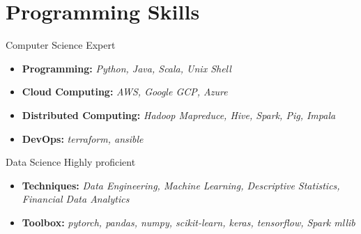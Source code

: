 \section{Programming Skills}\label{sec:programming-skills}

\resumeSubHeadingListStart
\resumeSubheading
{Computer Science}{}
{Expert}{}
\begin{itemize}
    \item \textbf{Programming:} \emph{Python, Java, Scala, Unix Shell}
    \item \textbf{Cloud Computing:} \emph{AWS, Google GCP, Azure}
    \item \textbf{Distributed Computing:} \emph{Hadoop Mapreduce, Hive, Spark, Pig, Impala}
    \item \textbf{DevOps:} \emph{terraform, ansible}
\end{itemize}

\resumeSubheading
{Data Science}{}
{Highly proficient}{}
\begin{itemize}
    \item \textbf{Techniques:} \emph{Data Engineering, Machine Learning, Descriptive Statistics, Financial Data Analytics}
    \item \textbf{Toolbox:} \emph{pytorch, pandas, numpy, scikit-learn, keras, tensorflow, Spark mllib}
\end{itemize}

\resumeSubHeadingListEnd